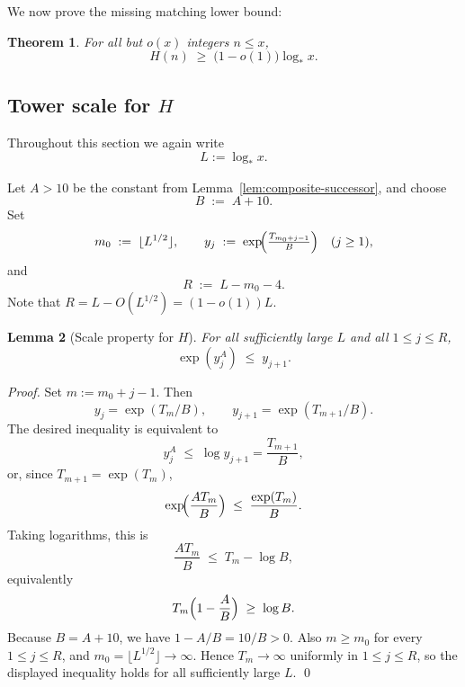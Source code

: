 \documentclass[11pt,reqno]{amsart}
\theoremstyle{plain}
\newtheorem{theorem}{Theorem}[section]
\newtheorem{lemma}[theorem]{Lemma}
\theoremstyle{definition}
\newcommand{\logstar}{\log_{\!*}}
\begin{document}
We now prove the missing matching lower bound:

\begin{theorem}\label{thm:lower-H}
For all but $o(x)$ integers $n\le x$,
\begin{equation}\label{eq:thm-lower-H}
H(n) \;\ge\; \bigl(1 - o(1)\bigr)\logstar x.
\end{equation}
\end{theorem}

\subsection{Tower scale for $H$}

Throughout this section we again write
\[
   L:=\logstar x.
\]

Let $A>10$ be the constant from Lemma~\ref{lem:composite-successor}, and choose
\begin{equation}\label{eq:B-choice}
B \;:=\; A+10.
\end{equation}
Set
\begin{equation}\label{eq:m0-mj-H}
m_0 \;:=\; \lfloor L^{1/2}\rfloor, \qquad y_j \;:=\; \exp\!\Bigl(\tfrac{T_{m_0+j-1}}{B}\Bigr) \quad (j\ge 1),
\end{equation}
and
\begin{equation}\label{eq:R-H}
R \;:=\; L - m_0 - 4.
\end{equation}
Note that $R = L - O(L^{1/2}) = (1-o(1))L$.

\begin{lemma}[Scale property for $H$]\label{lem:scale-H}
For all sufficiently large $L$ and all $1\le j\le R$,
\begin{equation}\label{eq:scale-H}
\exp(y_j^A) \;\le\; y_{j+1}.
\end{equation}
\end{lemma}

\begin{proof}
Set $m:=m_0+j-1$. Then
\[
y_j=\exp(T_m/B),\qquad y_{j+1}=\exp(T_{m+1}/B).
\]
The desired inequality is equivalent to
\[
y_j^A \;\le\; \log y_{j+1}=\frac{T_{m+1}}{B},
\]
or, since $T_{m+1}=\exp(T_m)$,
\[
\exp\!\Bigl(\frac{A T_m}{B}\Bigr)
\;\le\;
\frac{\exp(T_m)}{B}.
\]
Taking logarithms, this is
\[
\frac{A T_m}{B} \;\le\; T_m-\log B,
\]
equivalently
\[
T_m\Bigl(1-\frac{A}{B}\Bigr)\;\ge\; \log B.
\]
Because $B=A+10$, we have $1-A/B=10/B>0$. Also $m\ge m_0$ for every
$1\le j\le R$, and $m_0=\lfloor L^{1/2}\rfloor\to\infty$. Hence
$T_m\to\infty$ uniformly in $1\le j\le R$, so the displayed inequality holds
for all sufficiently large $L$. \qed
\end{proof}
\end{document}
